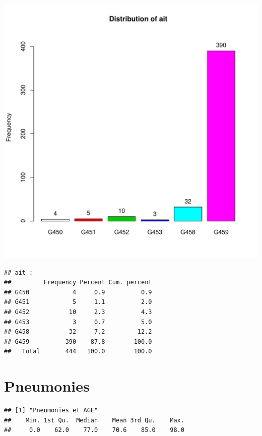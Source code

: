 \documentclass[12pt,english,french,twoside]{report}\usepackage[]{graphicx}\usepackage[]{color}
\makeatletter
\def\maxwidth{ %
  \ifdim\Gin@nat@width>\linewidth
    \linewidth
  \else
    \Gin@nat@width
  \fi
}
\newenvironment{kframe}{%
 \def\at@end@of@kframe{}%
 \ifinner\ifhmode%
  \def\at@end@of@kframe{\end{minipage}}%
  \begin{minipage}{\columnwidth}%
 \fi\fi%
 \def\FrameCommand##1{\hskip\@totalleftmargin \hskip-\fboxsep
 \colorbox{shadecolor}{##1}\hskip-\fboxsep
     \hskip-\linewidth \hskip-\@totalleftmargin \hskip\columnwidth}%
 \MakeFramed {\advance\hsize-\width
   \@totalleftmargin\z@ \linewidth\hsize
   \@setminipage}}%
 {\par\unskip\endMakeFramed%
 \at@end@of@kframe}
\newenvironment{knitrout}{}{} %
\makeatother
\begin{document}
\begin{knitrout}
\color{fgcolor}
\includegraphics[width=\maxwidth]{figure/ait} 
\begin{kframe}\begin{verbatim}
## ait :  
##         Frequency Percent Cum. percent
## G450            4     0.9          0.9
## G451            5     1.1          2.0
## G452           10     2.3          4.3
## G453            3     0.7          5.0
## G458           32     7.2         12.2
## G459          390    87.8        100.0
##   Total       444   100.0        100.0
\end{verbatim}
\end{kframe}
\end{knitrout}


\section{Pneumonies}

\begin{knitrout}
\color{fgcolor}\begin{kframe}
\begin{verbatim}
## [1] "Pneumonies et AGE"
##    Min. 1st Qu.  Median    Mean 3rd Qu.    Max. 
##     0.0    62.0    77.0    70.6    85.0    98.0
\end{verbatim}
\end{kframe}
\end{knitrout}
\end{document}
